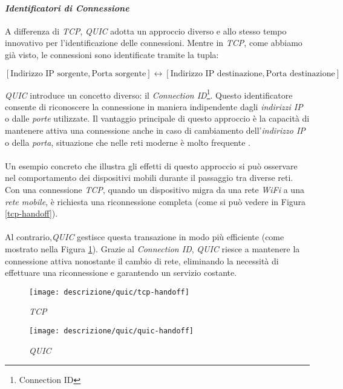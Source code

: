 \paragraph{\textit{Identificatori di Connessione}}
\noindent A differenza di \emph{TCP}, \emph{QUIC} adotta un approccio diverso e allo stesso tempo innovativo per l'identificazione delle connessioni. Mentre in \emph{TCP}, come abbiamo già visto, le connessioni sono identificate tramite la tupla:
\begin{center}
\small
$[\text{Indirizzo IP sorgente}, \text{Porta sorgente}] \leftrightarrow [\text{Indirizzo IP destinazione}, \text{Porta destinazione}]$
\end{center}
\emph{QUIC} introduce un concetto diverso: il \emph{Connection ID}\footnote{\gls{Connection ID}}. Questo identificatore consente di riconoscere la connessione in maniera indipendente dagli \emph{indirizzi IP} o dalle \emph{porte} utilizzate.
Il vantaggio principale di questo approccio è la capacità di mantenere attiva una connessione anche in caso di cambiamento dell'\emph{indirizzo IP} o della \emph{porta}, situazione che nelle reti moderne è molto frequente \cite{site:Explaining-QUIC}.
\\\\
Un esempio concreto che illustra gli effetti di questo approccio si può osservare nel comportamento dei dispositivi mobili durante il passaggio tra diverse reti.
Con una connessione \emph{TCP}, quando un dispositivo migra da una rete \emph{WiFi} a una \emph{rete mobile}, è richiesta una riconnessione completa (come si può vedere in Figura \ref{tcp-handoff}). 
\\\\
Al contrario,\emph{QUIC} gestisce questa transazione in modo più efficiente (come mostrato nella Figura \ref{quic-handoff}). Grazie al \emph{Connection ID}, \emph{QUIC} riesce a mantenere la connessione attiva nonostante il cambio di rete, eliminando la necessità di effettuare una riconnessione e garantendo un servizio costante.
\begin{figure}[!h]
    \centering
    \begin{minipage}{0.48\textwidth}
        \centering
        \texttt{[image: descrizione/quic/tcp-handoff]}
        \caption{\emph{TCP}}
        \label{tcp-handoff}
    \end{minipage}
    \hfill
    \begin{minipage}{0.48\textwidth}
        \centering
        \texttt{[image: descrizione/quic/quic-handoff]}
        \caption{\emph{QUIC}}
        \label{quic-handoff}
    \end{minipage}
\end{figure}
